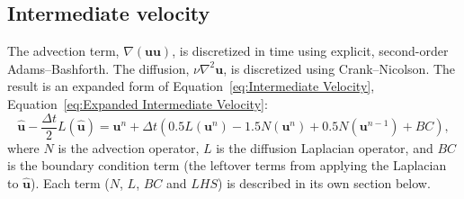 \subsection{Intermediate velocity}
\label{sec:ID NS intermediate velocity}

The advection term, $\nabla (\textbf{uu})$, is discretized in time using explicit, second-order Adams--Bashforth. 
The diffusion, $\nu \nabla^2 \textbf{u}$, is discretized using Crank--Nicolson. 
The result is an expanded form of Equation~\eqref{eq:Intermediate Velocity}, Equation~\eqref{eq:Expanded Intermediate Velocity}: 
\begin{equation}
\label{eq:Expanded Intermediate Velocity}
\hat{\textbf{u}} - \frac{\Delta t}{2}L(\hat{\textbf{u}}) = \textbf{u}^n + \Delta t\left(0.5L(\textbf{u}^n) - 1.5N(\textbf{u}^n) + 0.5N(\textbf{u}^{n-1}) + BC\right),
\end{equation}
where $N$ is the advection operator, $L$ is the diffusion Laplacian operator, and $BC$ is the boundary condition term (the leftover terms from applying the Laplacian to $\hat{\textbf{u}}$). 
Each term ($N$, $L$, $BC$ and $LHS$) is described in its own section below. 

